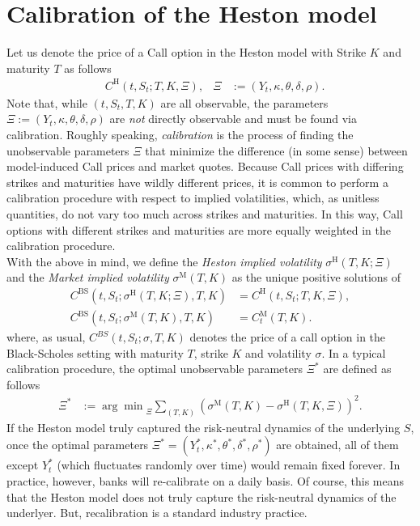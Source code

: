 \documentclass[12pt]{book}
\numberwithin{equation}{chapter}
\theoremstyle{plain}
\numberwithin{theorem}{section}
\theoremstyle{definition}
\numberwithin{exercise}{chapter}
\newcommand{\<}{\langle}
\renewcommand{\>}{\rangle}
\renewcommand{\(}{\left(}
\renewcommand{\)}{\right)}
\renewcommand{\[}{\left[}
\renewcommand{\]}{\right]}
\newcommand\sig{\sigma}
\theoremstyle{definition}
\numberwithin{question}{section}
\begin{document}
\section{Calibration of the Heston model}
\label{sec:calibration}
Let us denote the price of a Call option in the Heston model with Strike $K$ and maturity $T$ as follows
\begin{align}
	&	C^\text{H}(t,S_t;T,K,\Xi) , &
\Xi
	&:= (Y_t,\kappa, \theta, \delta, \rho) .
\end{align}
Note that, while $(t,S_t,T,K)$ are all observable, the parameters $\Xi:=(Y_t, \kappa, \theta, \delta, \rho)$ are \textit{not} directly observable and must be found via calibration.  Roughly speaking, \textit{calibration} is the process of finding the unobservable parameters $\Xi$ that minimize the difference (in some sense) between model-induced Call prices and market quotes.  Because Call prices with differing strikes and maturities have wildly different prices, it is common to perform a calibration procedure with respect to implied volatilities, which, as unitless quantities, do not vary too much across strikes and maturities.  In this way, Call options with different strikes and maturities are more equally weighted in the calibration procedure.
\\[0.5em]
With the above in mind, we define the \textit{Heston implied volatility} $\sigma^\text{H}(T,K;\Xi)$ and the \textit{Market implied volatility} $\sigma^\text{M}(T,K)$ as the unique positive solutions of
\begin{align}
C^\text{BS}(t,S_t;\sigma^\text{H}(T,K;\Xi),T,K) 
	&= C^\text{H} (t,S_t;T,K,\Xi) , \\
C^\text{BS} (t,S_t;\sigma^\text{M}(T,K),T,K) 
	&= C_t^\text{M}(T,K) .
\end{align}
where, as usual, $C^{BS}(t,S_t;\sig,T,K)$ denotes the price of a call option in the Black-Scholes setting with maturity $T$, strike $K$ and volatility $\sig$.
In a typical calibration procedure, the optimal unobservable parameters $\Xi^*$ are defined as follows
\begin{align}
	\Xi^* 
		&:= {\arg \min}_\Xi \sum_{(T,K)} \( \sigma^\text{M} (T,K) - \sigma^\text{H}(T,K,\Xi) \)^2.
\end{align}
If the Heston model truly captured the risk-neutral dynamics of the underlying $S$, once the optimal parameters $\Xi^*=(Y_t^*,\kappa^*, \theta^*, \delta^*, \rho^*)$ are obtained, all of them except $Y_t^*$ (which fluctuates randomly over time) would remain fixed forever.  In practice, however, banks will re-calibrate on a daily basis.  Of course, this means that the Heston model does not truly capture the risk-neutral dynamics of the underlyer.  But, recalibration is a standard industry practice.
\end{document}
